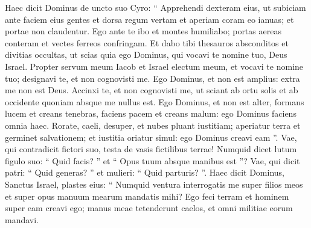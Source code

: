 \begin{biblechapter}
\begin{biblechapter}
\begin{biblechapter}
\begin{biblechapter}
\begin{biblechapter}
\begin{biblechapter}
\begin{biblechapter}
\begin{biblechapter}
\begin{biblechapter}
\begin{biblechapter}
\begin{biblechapter}
\begin{biblechapter}
\begin{biblechapter}
\begin{biblechapter}
\begin{biblechapter}
\begin{biblechapter}
\begin{biblechapter}
\begin{biblechapter}
\begin{biblechapter}
\begin{biblechapter}
\begin{biblechapter}
\begin{biblechapter}
\begin{biblechapter}
\begin{biblechapter}
\begin{biblechapter}
\begin{biblechapter}
\begin{biblechapter}
\begin{biblechapter}
\begin{biblechapter}
\begin{biblechapter}
\begin{biblechapter}
\begin{biblechapter}
\begin{biblechapter}
\begin{biblechapter}
\begin{biblechapter}
\begin{biblechapter}
\begin{biblechapter}
\begin{biblechapter}
\begin{biblechapter}
\begin{biblechapter}
\begin{biblechapter}
\begin{biblechapter}
\begin{biblechapter}
\begin{biblechapter}
\begin{biblechapter}
\verse Haec dicit Dominus de uncto suo Cyro:
 “ Apprehendi dexteram eius,
 ut subiciam ante faciem eius gentes
 et dorsa regum vertam
 et aperiam coram eo ianuas;
 et portae non claudentur.
 \verse Ego ante te ibo
 et montes humiliabo;
 portas aereas conteram
 et vectes ferreos confringam.
 \verse Et dabo tibi thesauros absconditos
 et divitias occultas,
 ut scias quia ego Dominus,
 qui vocavi te nomine tuo, Deus Israel.
 \verse Propter servum meum Iacob
 et Israel electum meum,
 et vocavi te nomine tuo;
 designavi te, et non cognovisti me.
 \verse Ego Dominus, et non est amplius:
 extra me non est Deus.
 Accinxi te, et non cognovisti me,
 \verse ut sciant ab ortu solis et ab occidente
 quoniam absque me nullus est.
 Ego Dominus, et non est alter,
 \verse formans lucem et creans tenebras,
 faciens pacem et creans malum:
 ego Dominus faciens omnia haec.
 \verse Rorate, caeli, desuper, et nubes pluant iustitiam;
 aperiatur terra
 et germinet salvationem;
 et iustitia oriatur simul:
 ego Dominus creavi eam ”.
 \verse Vae, qui contradicit fictori suo,
 testa de vasis fictilibus terrae!
 Numquid dicet lutum figulo suo: “ Quid facis? ”
 et “ Opus tuum absque manibus est ”?
 \verse Vae, qui dicit patri: “ Quid generas? ”
 et mulieri: “ Quid parturis? ”.
 \verse Haec dicit Dominus,
 Sanctus Israel, plastes eius:
 “ Numquid ventura interrogatis me super filios meos
 et super opus manuum mearum mandatis mihi?
 \verse Ego feci terram
 et hominem super eam creavi ego;
 manus meae tetenderunt caelos,
 et omni militiae eorum mandavi.

\end{biblechapter}
\end{biblechapter}
\end{biblechapter}
\end{biblechapter}
\end{biblechapter}
\end{biblechapter}
\end{biblechapter}
\end{biblechapter}
\end{biblechapter}
\end{biblechapter}
\end{biblechapter}
\end{biblechapter}
\end{biblechapter}
\end{biblechapter}
\end{biblechapter}
\end{biblechapter}
\end{biblechapter}
\end{biblechapter}
\end{biblechapter}
\end{biblechapter}
\end{biblechapter}
\end{biblechapter}
\end{biblechapter}
\end{biblechapter}
\end{biblechapter}
\end{biblechapter}
\end{biblechapter}
\end{biblechapter}
\end{biblechapter}
\end{biblechapter}
\end{biblechapter}
\end{biblechapter}
\end{biblechapter}
\end{biblechapter}
\end{biblechapter}
\end{biblechapter}
\end{biblechapter}
\end{biblechapter}
\end{biblechapter}
\end{biblechapter}
\end{biblechapter}
\end{biblechapter}
\end{biblechapter}
\end{biblechapter}
\end{biblechapter}
